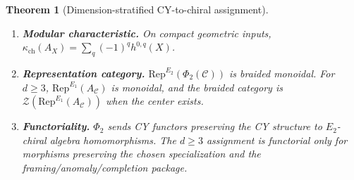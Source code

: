 \documentclass[11pt]{article}
\theoremstyle{plain}
\newtheorem{theorem}{Theorem}[section]
\theoremstyle{definition}
\theoremstyle{remark}
\newcommand{\Eone}{E_1}
\newcommand{\Etwo}{E_2}
\newcommand{\Rep}{\mathrm{Rep}}
\newcommand{\cC}{\mathcal{C}}
\newcommand{\cZ}{\mathcal{Z}}
\begin{document}
\begin{theorem}[Dimension-stratified CY-to-chiral assignment]
\begin{enumerate}[label=(\roman*)]
\item \textbf{Modular characteristic.}\; On compact geometric inputs,
$\kappa_{\mathrm{ch}}(A_X)=\sum_q(-1)^q h^{0,q}(X)$.

\item \textbf{Representation category.}\; $\Rep^{\Etwo}(\Phi_2(\cC))$
is braided monoidal. For $d \geq 3$, $\Rep^{\Eone}(A_\cC)$ is monoidal,
and the braided category is
$\cZ(\Rep^{\Eone}(A_\cC))$ when the center exists.

\item \textbf{Functoriality.}\; $\Phi_2$ sends CY functors preserving the
CY structure to $\Etwo$-chiral algebra homomorphisms. The
$d \geq 3$ assignment is functorial only for morphisms preserving the
chosen specialization and the framing/anomaly/completion package.
\end{enumerate}
\end{theorem}
\end{document}
